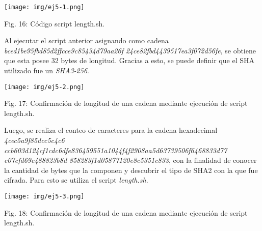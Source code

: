 \documentclass[12pt,oneside,a4paper]{book}
\begin{document}
\vspace{2em}

\begin{center}
    \texttt{[image: img/ej5-1.png]}
    
\vspace{0.1em}
    
    Fig. 16: Código script length.sh.
\end{center}

\vspace{2em}

Al ejecutar el script anterior asignando como cadena \textit{bced1be95fbd85d2ffcce9c85434d79aa26f}
\newline
\textit{24ce82fbd4439517ea3f072d56fe}, se obtiene que esta posee 32 bytes de longitud. Gracias a esto, se puede definir que el SHA utilizado fue un \textit{SHA3-256}.

\vspace{2em}

\begin{center}
    \texttt{[image: img/ej5-2.png]}
    
\vspace{0.1em}
    
    Fig. 17: Confirmación de longitud de una cadena mediante ejecución de script length.sh.
\end{center}

\vspace{2em}

\hspace{20pt}
Luego, se realiza el conteo de caracteres para la cadena hexadecimal \textit{4cec5a9f85dcc5c4c6}
\newline
\textit{ccb603d124cf1cdc6dfe836459551a1044f4f2908aa5d63739506f6468833d77
c07cfd69c488823b8d}
\newline
\textit{858283f1d05877120e8c5351c833}, con la finalidad de conocer la cantidad de bytes que la componen y descubrir el tipo de SHA2 con la que fue cifrada. Para esto se utiliza el script \textit{length.sh}.

\vspace{2em}

\begin{center}
    \texttt{[image: img/ej5-3.png]}
    
\vspace{0.1em}
    
    Fig. 18: Confirmación de longitud de una cadena mediante ejecución de script length.sh.
\end{center}
\end{document}
